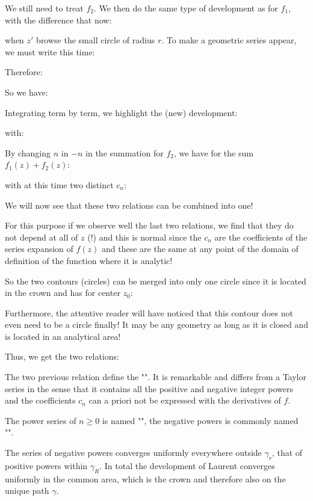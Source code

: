 	We still need to treat $f_2$. We then do the same type of development as for $f_1$, with the difference that now:
	
	when $z'$ browse the small circle of radius $r$. To make a geometric series appear, we must write this time:
	
	Therefore:
	
	So we have:
	
	Integrating term by term, we highlight the (new) development:
	
	with:
	
	By changing $n$ in $-n$ in the summation for $f_2$, we have for the sum $f_1(z)+f_2(z)$:
	
	with at this time two distinct $c_n$:
	
	We will now see that these two relations can be combined into one!
	
	For this purpose if we observe well the last two relations, we find that they do not depend at all of $z$ (!) and this is normal since the $c_n$ are the coefficients of the series expansion of $f(z)$ and these are the same at any point of the domain of definition of the function where it is analytic!
	
	So the two contours (circles) can be merged into only one circle since it is located in the crown and has for center $z_0$:
	
	Furthermore, the attentive reader will have noticed that this contour does not even need to be a circle finally! It may be any geometry as long as it is closed and is located in an analytical area!
	
	Thus, we get the two relations:
	
	The two previous relation define the "". It is remarkable and differs from a Taylor series in the sense that it contains all the positive and negative integer powers and the coefficients $c_n$ can a priori not be expressed with the derivatives of $f$.
	
	The power series of $n\geq 0$ is named "", the negative powers is commonly named "".
	
	The series of negative powers converges uniformly everywhere outside $\gamma_r$, that of positive powers within $\gamma_R$. In total the development of Laurent converges uniformly in the common area, which is the crown and therefore also on the unique path $\gamma$.
	

